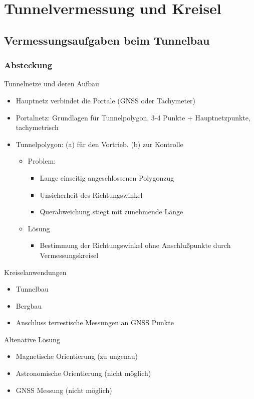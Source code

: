 \documentclass[12pt]{article}
\begin{document}
	\pagestyle{main}
\tableofcontents
\newpage
\section{Tunnelvermessung und Kreisel}	
\subsection{Vermessungsaufgaben beim Tunnelbau}
\subsubsection{Absteckung}
Tunnelnetze und deren Aufbau
\begin{itemize}
\item Hauptnetz verbindet die Portale (GNSS oder Tachymeter)
\item Portalnetz: Grundlagen für Tunnelpolygon, 3-4 Punkte + Hauptnetzpunkte, tachymetrisch
\item Tunnelpolygon: (a) für den Vortrieb. (b) zur Kontrolle 
	\begin{itemize}
		\item Problem: 
		\begin{itemize}
			\item Lange einseitig angeschlossenen Polygonzug
			\item Unsicherheit des Richtungswinkel
			\item Querabweichung stiegt mit zunehmende Länge
		\end{itemize}
		\item Lösung
		\begin{itemize}
			\item Bestimmung der Richtungswinkel ohne Anschlußpunkte durch Vermessungskreisel
		\end{itemize}
	\end{itemize}
\end{itemize}
Kreiselanwendungen
\begin{itemize}
	\item Tunnelbau
	\item Bergbau
	\item Anschluss terrestische Messungen an GNSS Punkte
\end{itemize}
Altenative Lösung
\begin{itemize}
	\item Magnetische Orientierung (zu ungenau)
	\item Astronomische Orientierung (nicht möglich)
	\item GNSS Messung (nicht möglich)
\end{itemize}
\end{document}
